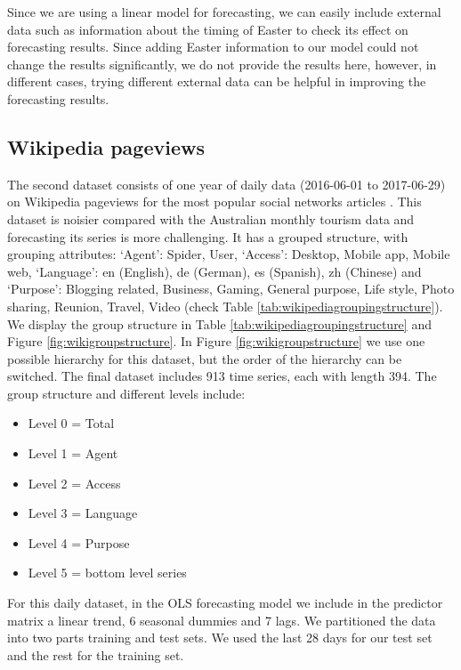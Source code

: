 \documentclass[11pt,a4paper,]{article}
\providecommand{\tightlist}{%
  \setlength{\itemsep}{0pt}\setlength{\parskip}{0pt}}
\begin{document}
Since we are using a linear model for forecasting, we can easily include
external data such as information about the timing of Easter to check
its effect on forecasting results. Since adding Easter information to
our model could not change the results significantly, we do not provide
the results here, however, in different cases, trying different external
data can be helpful in improving the forecasting results.

\FloatBarrier

\hypertarget{wikipedia-pageviews}{%
\subsection{Wikipedia pageviews}\label{wikipedia-pageviews}}

The second dataset consists of one year of daily data (2016-06-01 to
2017-06-29) on Wikipedia pageviews for the most popular social networks
articles \autocite{ashouri2018}. This dataset is noisier compared with
the Australian monthly tourism data and forecasting its series is more
challenging. It has a grouped structure, with grouping attributes:
`Agent': Spider, User, `Access': Desktop, Mobile app, Mobile web,
`Language': en (English), de (German), es (Spanish), zh (Chinese) and
`Purpose': Blogging related, Business, Gaming, General purpose, Life
style, Photo sharing, Reunion, Travel, Video (check Table
\ref{tab:wikipediagroupingstructure}). We display the group structure in
Table \ref{tab:wikipediagroupingstructure} and Figure
\ref{fig:wikigroupstructure}. In Figure \ref{fig:wikigroupstructure} we
use one possible hierarchy for this dataset, but the order of the
hierarchy can be switched. The final dataset includes 913 time series,
each with length 394. The group structure and different levels include:

\begin{itemize}
\tightlist
\item
  Level 0 = Total
\item
  Level 1 = Agent
\item
  Level 2 = Access
\item
  Level 3 = Language
\item
  Level 4 = Purpose
\item
  Level 5 = bottom level series
\end{itemize}

For this daily dataset, in the OLS forecasting model we include in the
predictor matrix a linear trend, 6 seasonal dummies and 7 lags. We
partitioned the data into two parts training and test sets. We used the
last 28 days for our test set and the rest for the training set.
\end{document}
